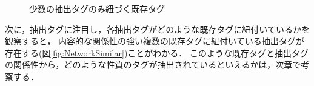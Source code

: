 \begin{figure}[H]
\begin{center}
\hspace*{-20pt}
\end{center}
\caption{少数の抽出タグのみ紐づく既存タグ}
\label{fig:NetworkLittle}
\end{figure}

次に，抽出タグに注目し，各抽出タグがどのような既存タグに紐付いているかを観察すると，
内容的な関係性の強い複数の既存タグに紐付いている抽出タグが存在する(図\ref{fig:NetworkSimilar})ことがわかる．	
このような既存タグと抽出タグの関係性から，どのような性質のタグが抽出されているといえるかは，次章で考察する．

